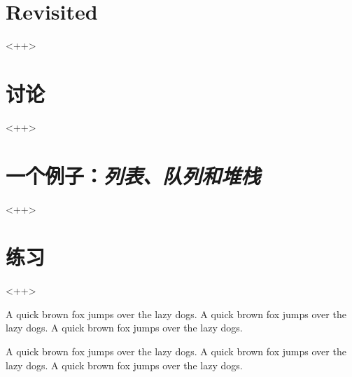 \section{ Revisited}<++>

\section{讨论}<++>

\section{一个例子：\emph{列表、队列和堆栈}}<++>

\section{练习}<++>

A quick brown fox jumps over the lazy dogs.
A quick brown fox jumps over the lazy dogs.
A quick brown fox jumps over the lazy dogs.

A quick brown fox jumps over the lazy dogs.
A quick brown fox jumps over the lazy dogs.
A quick brown fox jumps over the lazy dogs.

\newpage{\thispagestyle{empty}\cleardoublepage}

